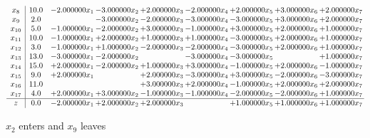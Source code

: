 \documentclass[10pt]{article}
\begin{document}
\[\begin{array}{c| c c@{\hskip 2pt} c@{\hskip 2pt} c@{\hskip 2pt} c@{\hskip 2pt} c@{\hskip 2pt} c@{\hskip 2pt} c@{\hskip 2pt} }
 x_{8}   &  10.0 & -2.000000 x_{1} & -3.000000 x_{2} & + 2.000000 x_{3} & -2.000000 x_{4} & + 2.000000 x_{5} & + 3.000000 x_{6} & + 2.000000 x_{7}\\
 x_{9}   &  2.0  &   & -3.000000 x_{2} & -2.000000 x_{3} & -3.000000 x_{4} & -3.000000 x_{5} & + 3.000000 x_{6} & + 2.000000 x_{7}\\
 x_{10}   &  5.0 & -1.000000 x_{1} & -2.000000 x_{2} & + 3.000000 x_{3} & -1.000000 x_{4} & + 3.000000 x_{5} & + 2.000000 x_{6} & + 1.000000 x_{7}\\
 x_{11}   &  10.0 & -1.000000 x_{1} & + 2.000000 x_{2} & + 1.000000 x_{3} & + 1.000000 x_{4} & -3.000000 x_{5} & + 2.000000 x_{6} & + 1.000000 x_{7}\\
 x_{12}   &  3.0 & -1.000000 x_{1} & + 1.000000 x_{2} & -2.000000 x_{3} & -2.000000 x_{4} & -3.000000 x_{5} & + 2.000000 x_{6} & + 1.000000 x_{7}\\
 x_{13}   &  13.0 & -3.000000 x_{1} & -2.000000 x_{2} &   & -3.000000 x_{4} & -3.000000 x_{5} &   & + 1.000000 x_{7}\\
 x_{14}   &  15.0 & + 2.000000 x_{1} & -2.000000 x_{2} & + 1.000000 x_{3} & + 3.000000 x_{4} & -1.000000 x_{5} & + 2.000000 x_{6} & -1.000000 x_{7}\\
 x_{15}   &  9.0 & + 2.000000 x_{1} &   & + 2.000000 x_{3} & -3.000000 x_{4} & + 3.000000 x_{5} & -2.000000 x_{6} & -3.000000 x_{7}\\
 x_{16}   &  11.0  &    &   & + 3.000000 x_{3} & + 2.000000 x_{4} & -1.000000 x_{5} & + 2.000000 x_{6} & + 2.000000 x_{7}\\
 x_{17}   &  4.0 & + 2.000000 x_{1} & + 3.000000 x_{2} & -1.000000 x_{3} & -1.000000 x_{4} & -2.000000 x_{5} & -2.000000 x_{6} & + 1.000000 x_{7}\\
\hline
z    &  0.0 & -2.000000 x_{1} & + 2.000000 x_{2} & + 2.000000 x_{3} &   & + 1.000000 x_{5} & + 1.000000 x_{6} & + 1.000000 x_{7}\\
\end{array}\]


 $ x_{2} $ enters and $ x_{9} $ leaves 
\end{document}
